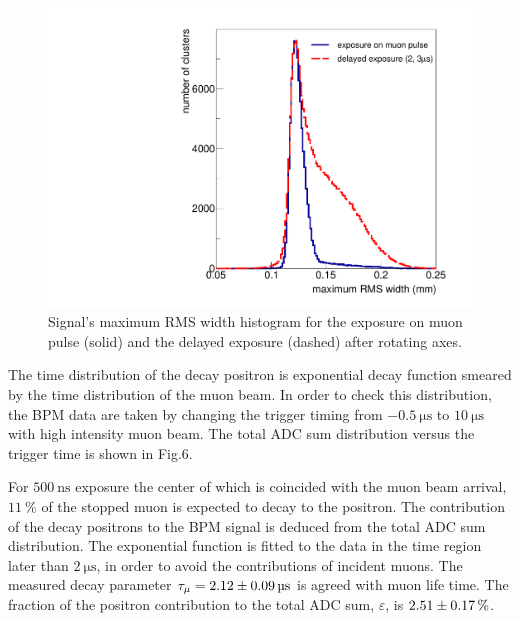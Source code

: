 \documentclass[preprint,3p,twocolumn]{elsarticle}
\begin{document}
\begin{figure}[tb]
	\begin{minipage}[t]{60mm}
		\includegraphics[width=1.30\textwidth, height=1.1\textwidth]{figure/RMS_legend_v2.pdf}
	\end{minipage}
	\caption{Signal's maximum RMS width histogram for the exposure on muon pulse (solid) and the delayed exposure (dashed) after rotating axes.}
	\label{fig:positron_width}
\end{figure}
The time distribution of the decay positron is exponential decay function smeared by the time distribution of the muon beam. In order to check this distribution, the BPM data are taken by changing the trigger timing from $\SI{-0.5}{\micro\s}$ to $\SI{10}{\micro\s}$ with high intensity muon beam. The total ADC sum distribution versus the trigger time is shown in Fig.6.

For $\SI{500}{\nano\s}$ exposure the center of which is coincided with the muon beam arrival, $\SI{11}{\percent}$ of the stopped muon is expected to decay to the positron. The contribution of the decay positrons to the BPM signal is deduced from the total ADC sum distribution. The exponential function is fitted to the data in the time region later than $\SI{2}{\micro\s}$, in order to avoid the contributions of incident muons. The measured decay parameter $\tau_{\mu}=\SI{2.12 \pm 0.09}{\micro\s}$ is agreed with muon life time. The fraction of the positron contribution to the total ADC sum, $\varepsilon$, is $\SI{2.51\pm0.17}{\percent}$.
\end{document}
